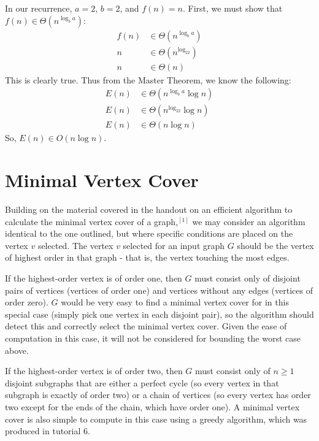 \documentclass{article}
\begin{document}
In our recurrence, $a=2$, $b=2$, and $f(n) = n$. First, we must show that $f(n)
\in \Theta(n^{\log_ba})$:
\begin{align*}
f(n) &\in \Theta(n^{\log_ba}) \\
n &\in \Theta(n^{\log_22}) \\
n &\in \Theta(n)
\end{align*}
This is clearly true. Thus from the Master Theorem, we know the following:
\begin{align*}
E(n) &\in \Theta(n^{\log_ba}\log n) \\
E(n) &\in \Theta(n^{\log_22}\log n) \\
E(n) &\in \Theta(n \log n)
\end{align*}
So, $E(n) \in O(n \log n)$.

\section{Minimal Vertex Cover}

Building on the material covered in the handout on an efficient algorithm to
calculate the minimal vertex cover of a graph,$^{[1]}$ we may consider an
algorithm identical to the one outlined, but where specific conditions are
placed on the vertex $v$ selected. The vertex $v$ selected for an input graph
$G$ should be the vertex of highest order in that graph - that is, the vertex
touching the most edges.

If the highest-order vertex is of order one, then $G$ must consist only of
disjoint pairs of vertices (vertices of order one) and vertices without any
edges (vertices of order zero). $G$ would be very easy to find a minimal vertex
cover for in this special case (simply pick one vertex in each disjoint pair),
so the algorithm should detect this and correctly select the minimal vertex
cover. Given the ease of computation in this case, it will not be considered for
bounding the worst case above.

If the highest-order vertex is of order two, then $G$ must consist only of
$n\geq1$ disjoint subgraphs that are either a perfect cycle (so every vertex in
that subgraph is exactly of order two) or a chain of vertices (so every vertex
has order two except for the ends of the chain, which have order one). A minimal
vertex cover is also simple to compute in this case using a greedy algorithm,
which was produced in tutorial 6.
\end{document}
